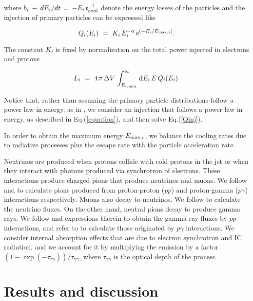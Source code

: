 \documentclass[baaa]{baaa}
\begin{document}
\noindent where $b_{i} \, \equiv \, dE_i/dt \, = \, -E_i \, t^{-1}_{\rm cool}$ denote the energy losses of the particles and the injection of primary particles can be expressed like

\begin{equation} \label{Qinj}
  Q_{i}(E_i) \ = \ K_{i} \, E_i^{-\alpha} \, \mathrm{e}^{({-E_i}/{E_{{\rm max},i}})} \label{Qi} .
  \end{equation} 

The constant $K_{i}$ is fixed by normalization on the total power injected in electrons and protons

\begin{equation}
L_{i} \ = \ 4 \, \pi \, \Delta V \, \int_{E_{i,\rm min}}^\infty \, {\rm d}E_i \, E\, Q_{i}(E_i).
\end{equation}

Notice that, rather than assuming the primary particle distributions follow a power law in energy, as in \citet{Tagawa2023}, we consider an injection that follows a power law in energy, as described in Eq.(\ref{equation}), and then solve Eq.(\ref{Qinj}).

In order to obtain the maximum energy $E_{{\rm max},i}$, we balance the cooling rates due to radiative processes plus the escape rate with the particle acceleration rate.

Neutrinos are produced when protons collide with cold protons in the jet or when they interact with photons produced via synchrotron of electrons. These interactions produce charged pions that produce neutrinos and muons. We follow \cite{Kelner2006} and \cite{Hümmer2010} to calculate pions produced from proton-proton ($pp$) and proton-gamma ($p\gamma$) interactions respectively. Muons also decay to neutrinos. We follow \cite{Lipari2007} to calculate the neutrino fluxes. On the other hand, neutral pions decay to produce gamma rays.
We follow \cite{Kelner2006} and expressions therein to obtain the gamma ray fluxes by $pp$ interactions, and refer to \cite{Kelner2008} to calculate those originated by $p\gamma$ interactions. We consider internal absorption effects that are due to electron synchrotron and IC radiation, and we account for it by multiplying the emission by a factor $(1-\exp(-\tau_{\gamma\gamma}))/\tau_{\gamma\gamma}$, where $\tau_{\gamma\gamma}$ is the optical depth of the process.

\section{Results and discussion}
\end{document}
